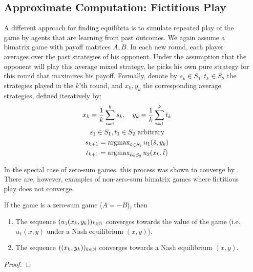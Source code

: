 \documentclass[a4paper]{scrreprt}
\begin{document}
    \subsection{Approximate Computation: Fictitious Play}
    A different approach for finding equilibria is to simulate repeated play of the game by agents that are learning from past outcomes.
    We again assume a bimatrix game with payoff matrices $A, B$.
    In each new round, each player averages over the past strategies of his opponent. Under the assumption that the opponent will play this average mixed strategy, he picks his own pure strategy for this round that maximizes his payoff. Formally, denote by $s_k \in S_1, t_k \in S_2$ the strategies played in the $k$'th round, and $x_k, y_k$ the corresponding average strategies, defined iteratively by:
    \begin{gather*}
        x_k = \frac{1}{k} \sum_{i=1}^{k} s_k, \quad y_k = \frac{1}{k} \sum_{i=1}^{k} t_k \\
        s_1 \in S_1, t_1 \in S_2 \text{ arbitrary} \\
        s_{k+1} = \argmax\limits_{\tilde{s} \in S_1} u_1(\tilde{s}, y_k) \\ %
        t_{k+1} = \argmax\limits_{\tilde{t} \in S_2} u_2(x_k, \tilde{t})
    \end{gather*}
    
    In the special case of zero-sum games, this process was shown to converge by \cite{bib:robinsonFictitiousPlay}.
    There are, however, examples of non-zero-sum bimatrix games where fictitious play does not converge.
    
    \begin{thm}
        If the game is a zero-sum game ($A=-B$), then 
        \begin{enumerate}
            \item The sequence $(u_1(x_k, y_k))_{k \in \mathbb{N}}$ converges towards the value of the game (i.e. $u_1(x, y)$ under a Nash equilibrium $(x, y)$).
            \item The sequence $((x_k, y_k))_{k \in \mathbb{N}}$ converges towards a Nash equilibrium $(x, y)$.
        \end{enumerate}
    \end{thm}
    \begin{proof}
    \end{proof}
    
\end{document}
